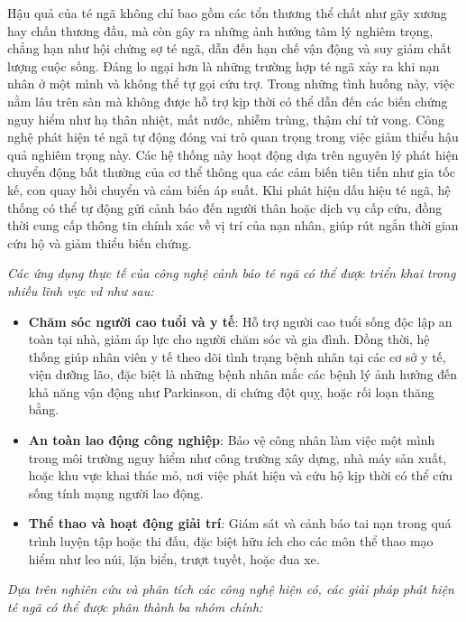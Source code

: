 \documentclass[a4paper,12pt]{report}
\begin{document}
	Hậu quả của té ngã không chỉ bao gồm các tổn thương thể chất như gãy xương hay chấn thương đầu, mà còn gây ra những ảnh hưởng tâm lý nghiêm trọng, chẳng hạn như hội chứng sợ té ngã, dẫn đến hạn chế vận động và suy giảm chất lượng cuộc sống. Đáng lo ngại hơn là những trường hợp té ngã xảy ra khi nạn nhân ở một mình và không thể tự gọi cứu trợ. Trong những tình huống này, việc nằm lâu trên sàn mà không được hỗ trợ kịp thời có thể dẫn đến các biến chứng nguy hiểm như hạ thân nhiệt, mất nước, nhiễm trùng, thậm chí tử vong. Công nghệ phát hiện té ngã tự động đóng vai trò quan trọng trong việc giảm thiểu hậu quả nghiêm trọng này. Các hệ thống này hoạt động dựa trên nguyên lý phát hiện chuyển động bất thường của cơ thể thông qua các cảm biến tiên tiến như gia tốc kế, con quay hồi chuyển và cảm biến áp suất. Khi phát hiện dấu hiệu té ngã, hệ thống có thể tự động gửi cảnh báo đến người thân hoặc dịch vụ cấp cứu, đồng thời cung cấp thông tin chính xác về vị trí của nạn nhân, giúp rút ngắn thời gian cứu hộ và giảm thiểu biến chứng.
	
	\newpage
	
	\textit{Các ứng dụng thực tế của công nghệ cảnh báo té ngã có thể được triển khai trong nhiều lĩnh vực vd như sau:}
	
	\begin{itemize}
		\item \textbf{Chăm sóc người cao tuổi và y tế}: Hỗ trợ người cao tuổi sống độc lập an toàn tại nhà, giảm áp lực cho người chăm sóc và gia đình. Đồng thời, hệ thống giúp nhân viên y tế theo dõi tình trạng bệnh nhân tại các cơ sở y tế, viện dưỡng lão, đặc biệt là những bệnh nhân mắc các bệnh lý ảnh hưởng đến khả năng vận động như Parkinson, di chứng đột quỵ, hoặc rối loạn thăng bằng.
		
		\item \textbf{An toàn lao động công nghiệp}: Bảo vệ công nhân làm việc một mình trong môi trường nguy hiểm như công trường xây dựng, nhà máy sản xuất, hoặc khu vực khai thác mỏ, nơi việc phát hiện và cứu hộ kịp thời có thể cứu sống tính mạng người lao động.
		
		\item \textbf{Thể thao và hoạt động giải trí}: Giám sát và cảnh báo tai nạn trong quá trình luyện tập hoặc thi đấu, đặc biệt hữu ích cho các môn thể thao mạo hiểm như leo núi, lặn biển, trượt tuyết, hoặc đua xe.
		
	\end{itemize}
	
	\textit{Dựa trên nghiên cứu và phân tích các công nghệ hiện có, các giải pháp phát hiện té ngã có thể được phân thành ba nhóm chính:}
	
\end{document}
